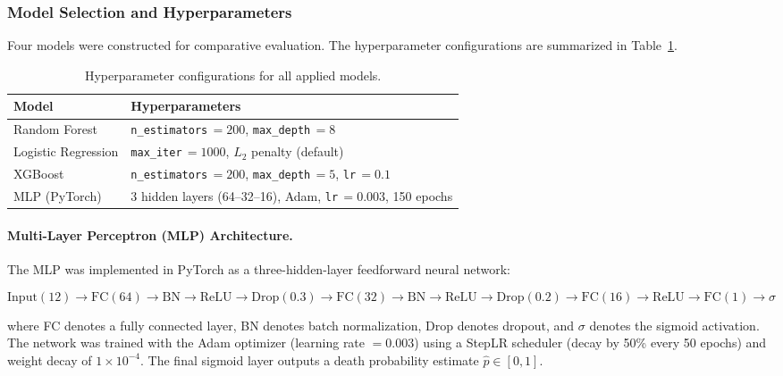 \documentclass[12pt,a4paper]{article}
\begin{document}
\subsubsection{Model Selection and Hyperparameters}

Four models were constructed for comparative evaluation. The hyperparameter configurations are summarized in Table~\ref{tab:hyperparams}.

\begin{table}[H]
\centering
\caption{Hyperparameter configurations for all applied models.}
\label{tab:hyperparams}
\begin{tabular}{ll}
\toprule
\textbf{Model} & \textbf{Hyperparameters} \\
\midrule
Random Forest       & \texttt{n\_estimators}$\,=200$, \texttt{max\_depth}$\,=8$ \\
Logistic Regression & \texttt{max\_iter}$\,=1000$, $L_2$ penalty (default) \\
XGBoost             & \texttt{n\_estimators}$\,=200$, \texttt{max\_depth}$\,=5$, \texttt{lr}$\,=0.1$ \\
MLP (PyTorch)       & 3 hidden layers (64--32--16), Adam, \texttt{lr}$\,=0.003$, 150 epochs \\
\bottomrule
\end{tabular}
\end{table}

\paragraph{Multi-Layer Perceptron (MLP) Architecture.}
The MLP was implemented in PyTorch as a three-hidden-layer feedforward neural network:

\begin{equation}
\label{eq:mlp_arch}
\mathrm{Input}(12) \!\to\! \mathrm{FC}(64) \!\to\! \mathrm{BN} \!\to\! \mathrm{ReLU} \!\to\! \mathrm{Drop}(0.3) \!\to\! \mathrm{FC}(32) \!\to\! \mathrm{BN} \!\to\! \mathrm{ReLU} \!\to\! \mathrm{Drop}(0.2) \!\to\! \mathrm{FC}(16) \!\to\! \mathrm{ReLU} \!\to\! \mathrm{FC}(1) \!\to\! \sigma
\end{equation}

\noindent where FC denotes a fully connected layer, BN denotes batch normalization, Drop denotes dropout, and $\sigma$ denotes the sigmoid activation. The network was trained with the Adam optimizer (learning rate $= 0.003$) using a StepLR scheduler (decay by 50\% every 50 epochs) and weight decay of $1 \times 10^{-4}$. The final sigmoid layer outputs a death probability estimate $\hat{p} \in [0, 1]$.
\end{document}
